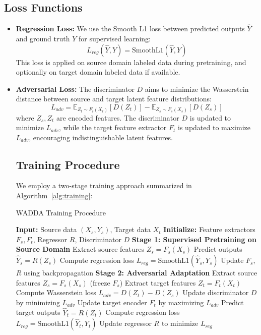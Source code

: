 \documentclass{article}
\begin{document}
\subsection{Loss Functions}
\begin{itemize}
  \item \textbf{Regression Loss:} We use the Smooth L1 loss between predicted outputs $\hat{Y}$ and ground truth $Y$ for supervised learning:
  \[
  L_{reg}(\hat{Y}, Y) = \text{SmoothL1}(\hat{Y}, Y)
  \]
  This loss is applied on source domain labeled data during pretraining, and optionally on target domain labeled data if available.
  
  \item \textbf{Adversarial Loss:} The discriminator $D$ aims to minimize the Wasserstein distance between source and target latent feature distributions:
  \[
  L_{adv} = \mathbb{E}_{Z_t \sim F_t(X_t)}[D(Z_t)] - \mathbb{E}_{Z_s \sim F_s(X_s)}[D(Z_s)]
  \]
  where $Z_s, Z_t$ are encoded features. The discriminator $D$ is updated to minimize $L_{adv}$, while the target feature extractor $F_t$ is updated to maximize $L_{adv}$, encouraging indistinguishable latent features.

\subsection{Training Procedure}
We employ a two-stage training approach summarized in Algorithm~\ref{alg:training}:

\begin{algorithm}
\caption{WADDA Training Procedure}
\label{alg:training}
\begin{algorithmic}[1]
\State \textbf{Input:} Source data $(X_s, Y_s)$, Target data $X_t$
\State \textbf{Initialize:} Feature extractors $F_s, F_t$, Regressor $R$, Discriminator $D$
\State \textbf{Stage 1: Supervised Pretraining on Source Domain}
    \State Extract source features $Z_s = F_s(X_s)$
    \State Predict outputs $\hat{Y}_s = R(Z_s)$
    \State Compute regression loss $L_{reg} = \text{SmoothL1}(\hat{Y}_s, Y_s)$
    \State Update $F_s$, $R$ using backpropagation
\EndFor
\State \textbf{Stage 2: Adversarial Adaptation}
        \State Extract source features $Z_s = F_s(X_s)$ (freeze $F_s$)
        \State Extract target features $Z_t = F_t(X_t)$
        \State Compute Wasserstein loss $L_{adv} = D(Z_t) - D(Z_s)$
        \State Update discriminator $D$ by minimizing $L_{adv}$
        \State Update target encoder $F_t$ by maximizing $L_{adv}$
        \State Predict target outputs $\hat{Y}_t = R(Z_t)$
            \State Compute regression loss $L_{reg} = \text{SmoothL1}(\hat{Y}_t, Y_t)$
            \State Update regressor $R$ to minimize $L_{reg}$
        \EndIf
    \EndFor
\EndFor
\end{algorithmic}
\end{algorithm}


\end{itemize}
\end{document}

